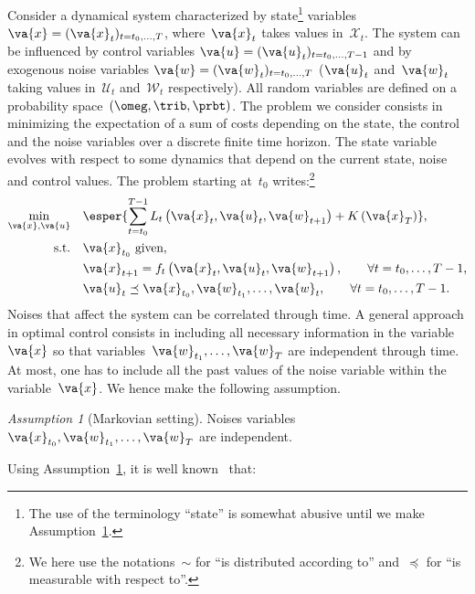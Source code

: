 \documentclass[a4paper]{amsart}
\theoremstyle{plain}
\theoremstyle{definition}
\theoremstyle{remark}
\newtheorem{hyp}{Assumption}
\begin{document}
Consider a dynamical system characterized by state\footnote{The
use of the terminology ``state'' is somewhat abusive until we make
Assumption~\ref{hyp:Markov}.} variables
$\va{x}=(\va{x}_t)_{t=t_0,\dots,T}$, where~$\va{x}_t$ takes values
in~$\mathcal{X}_t$. The system can be influenced by control
variables $\va{u}=(\va{u}_t)_{t=t_0,\dots,T-1}$ and by exogenous
noise variables $\va{w} = (\va{w}_t)_{t=t_0, \dots, T}$
($\va{u}_t$ and~$\va{w}_t$ taking values in~$\mathcal{U}_t$
and~$\mathcal{W}_t$ respectively). All random variables are
defined on a probability space~$(\omeg, \trib, \prbt)$. The
problem we consider consists in minimizing the expectation of a
sum of costs depending on the state, the control and the noise
variables over a discrete finite time horizon. The state variable
evolves with respect to some dynamics that depend on the current
state, noise and control values. The problem starting at~$t_0$
writes:\footnote{We here use the notations~$\sim$ for ``is
distributed according to'' and~$\preceq$ for ``is measurable with
respect to''.}
\begin{subequations} \label{eqn:Psto}
\begin{align}
\min_{\va{x}, \va{u}} \quad& \esper{\sum_{t=t_0}^{T-1}
L_t\left(\va{x}_t, \va{u}_t, \va{w}_{t+1}\right) +
K\left(\va{x}_T\right)}, \\
\text{s.t.} \quad& \va{x}_{t_0} \text{ given}, \\
& \va{x}_{t+1} = f_t\left(\va{x}_t, \va{u}_t, \va{w}_{t+1}\right),
\qquad \forall t=t_0, \dots, T-1, \\
& \va{u}_t \preceq \va{x}_{t_0}, \va{w}_{t_1}, \dots, \va{w}_t,
\qquad \forall t = t_0, \dots, T-1.
\end{align}
\end{subequations}
Noises that affect the system can be correlated through time. A
general approach in optimal control consists in including all
necessary information in the variable~$\va{x}$ so that
variables~$\va{w}_{t_1}, \dots, \va{w}_T$ are independent through
time. At most, one has to include all the past values of the noise
variable within the variable~$\va{x}$. We hence make the following
assumption.
\begin{hyp}[Markovian setting] \label{hyp:Markov}
    Noises variables~$\va{x}_{t_0}, \va{w}_{t_1}, \dots, \va{w}_T$ are
    independent.
\end{hyp}
Using Assumption~\ref{hyp:Markov}, it is well
known~\citep[see][]{BertsekasDP} that:
\end{document}
